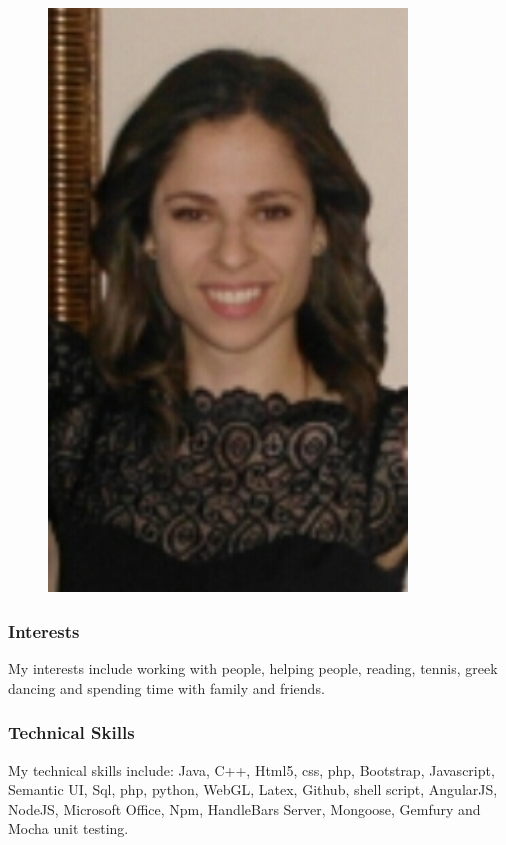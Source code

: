 \documentclass[hidelinks, 12pt, oneside]{article}
\begin{document}
\begin{figure}[ht!]
  \centering
    \includegraphics[width=0.85\textwidth]{t} 
\end{figure}

\subsubsection{Interests}
My interests include working with people, helping people, reading, tennis, greek dancing and spending time with family and friends. 
\subsubsection{Technical Skills}
My technical skills include: Java, C++, Html5, css, php, Bootstrap, Javascript, Semantic UI, Sql, php, python,  WebGL, Latex, Github, shell script, AngularJS, NodeJS, Microsoft Office, Npm, HandleBars Server, Mongoose, Gemfury and Mocha unit testing. 
\end{document}
